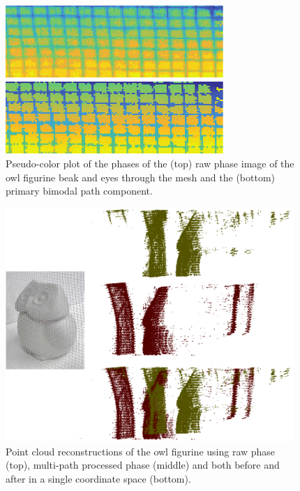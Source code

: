 \documentclass[10pt]{article}
\begin{document}
\begin{figure}[!t]
	\centering\includegraphics[width=3.25in]{Figures/figure11}
	\caption{Pseudo-color plot of the phases of the (top) raw phase image of the owl figurine beak and eyes through the mesh and the (bottom) primary  bimodal path component.}
	\label{fig11}
\end{figure}



\begin{figure}[t]
	\centering\includegraphics[width=4.3in]{Figures/owl}
	\caption{Point cloud reconstructions of the owl figurine using raw phase (top), multi-path processed phase (middle) and both before and after in a single coordinate space (bottom).}
	\label{owl}
\end{figure}
\end{document}
